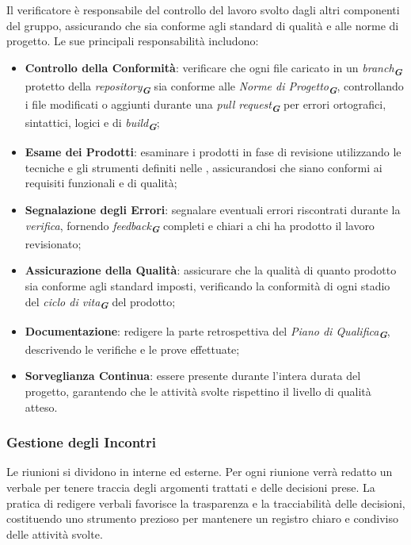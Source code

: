 Il verificatore è responsabile del controllo del lavoro svolto dagli altri componenti del gruppo, assicurando che sia conforme agli standard di qualità e alle norme di progetto. 
Le sue principali responsabilità includono:
\begin{itemize}
    \item \textbf{Controllo della Conformità}: verificare che ogni file caricato in un \emph{branch}\textsubscript{\textit{\textbf{G}}} protetto della \emph{repository}\textsubscript{\textit{\textbf{G}}} sia conforme alle \emph{Norme di Progetto}\textsubscript{\textit{\textbf{G}}}, controllando i file modificati o aggiunti durante una \emph{pull request}\textsubscript{\textit{\textbf{G}}} per errori ortografici, sintattici, logici e di \emph{build}\textsubscript{\textit{\textbf{G}}};
    \item \textbf{Esame dei Prodotti}: esaminare i prodotti in fase di revisione utilizzando le tecniche e gli strumenti definiti nelle , assicurandosi che siano conformi ai requisiti funzionali e di qualità;
    \item \textbf{Segnalazione degli Errori}: segnalare eventuali errori riscontrati durante la \emph{verifica}, fornendo \emph{feedback}\textsubscript{\textit{\textbf{G}}} completi e chiari a chi ha prodotto il lavoro revisionato;
    \item \textbf{Assicurazione della Qualità}: assicurare che la qualità di quanto prodotto sia conforme agli standard imposti, verificando la conformità di ogni stadio del \emph{ciclo di vita}\textsubscript{\textit{\textbf{G}}} del prodotto;
    \item \textbf{Documentazione}: redigere la parte retrospettiva del \emph{Piano di Qualifica}\textsubscript{\textit{\textbf{G}}}, descrivendo le verifiche e le prove effettuate;
    \item \textbf{Sorveglianza Continua}: essere presente durante l’intera durata del progetto, garantendo che le attività svolte rispettino il livello di qualità atteso.
\end{itemize}

\subsubsection{Gestione degli Incontri}
Le riunioni si dividono in interne ed esterne. Per ogni riunione verrà redatto un verbale per tenere traccia degli argomenti trattati e delle decisioni prese. 
La pratica di redigere verbali favorisce la trasparenza e la tracciabilità delle decisioni, costituendo uno strumento prezioso per mantenere un registro chiaro e condiviso delle attività svolte.

